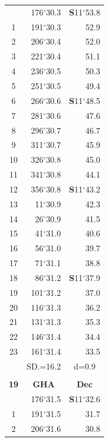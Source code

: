 \documentclass[10pt, a4paper]{report}
\begin{document}
\begin{scriptsize}
\begin{tabular*}{0.2\textwidth}[t]{@{\extracolsep{\fill}}|c|rr|}
\hline\rule{0pt}{2.6ex}\noindent
0 & 176$^\circ$30.3 & \textbf{S}11$^\circ$53.8\\
1 & 191$^\circ$30.3 & 52.9\\
2 & 206$^\circ$30.4 & 52.0\\
3 & 221$^\circ$30.4 & \raisebox{0.24ex}{\boldmath$\cdot$~\boldmath$\cdot$~~}51.1\\
4 & 236$^\circ$30.5 & 50.3\\
5 & 251$^\circ$30.5 & 49.4\\[2Pt]
6 & 266$^\circ$30.6 & \textbf{S}11$^\circ$48.5\\
7 & 281$^\circ$30.6 & 47.6\\
8 & 296$^\circ$30.7 & 46.7\\
9 & 311$^\circ$30.7 & \raisebox{0.24ex}{\boldmath$\cdot$~\boldmath$\cdot$~~}45.9\\
10 & 326$^\circ$30.8 & 45.0\\
11 & 341$^\circ$30.8 & 44.1\\[2Pt]
12 & 356$^\circ$30.8 & \textbf{S}11$^\circ$43.2\\
13 & 11$^\circ$30.9 & 42.3\\
14 & 26$^\circ$30.9 & 41.5\\
15 & 41$^\circ$31.0 & \raisebox{0.24ex}{\boldmath$\cdot$~\boldmath$\cdot$~~}40.6\\
16 & 56$^\circ$31.0 & 39.7\\
17 & 71$^\circ$31.1 & 38.8\\[2Pt]
18 & 86$^\circ$31.2 & \textbf{S}11$^\circ$37.9\\
19 & 101$^\circ$31.2 & 37.0\\
20 & 116$^\circ$31.3 & 36.2\\
21 & 131$^\circ$31.3 & \raisebox{0.24ex}{\boldmath$\cdot$~\boldmath$\cdot$~~}35.3\\
22 & 146$^\circ$31.4 & 34.4\\
23 & 161$^\circ$31.4 & 33.5\\
\hline
\rule{0pt}{2.4ex} & \multicolumn{1}{c}{SD.=16.2} & \multicolumn{1}{c|}{d=0.9}\\
\hline
\multicolumn{1}{c}{}\\[-0.5ex]\hline
\multicolumn{1}{|c|}{\rule{0pt}{2.6ex}\textbf{19}} & \multicolumn{1}{c}{\textbf{GHA}} & \multicolumn{1}{c|}{\textbf{Dec}}\\
\hline\rule{0pt}{2.6ex}\noindent
0 & 176$^\circ$31.5 & \textbf{S}11$^\circ$32.6\\
1 & 191$^\circ$31.5 & 31.7\\
2 & 206$^\circ$31.6 & 30.8\\

\end{tabular*}
\end{scriptsize}
\end{document}
